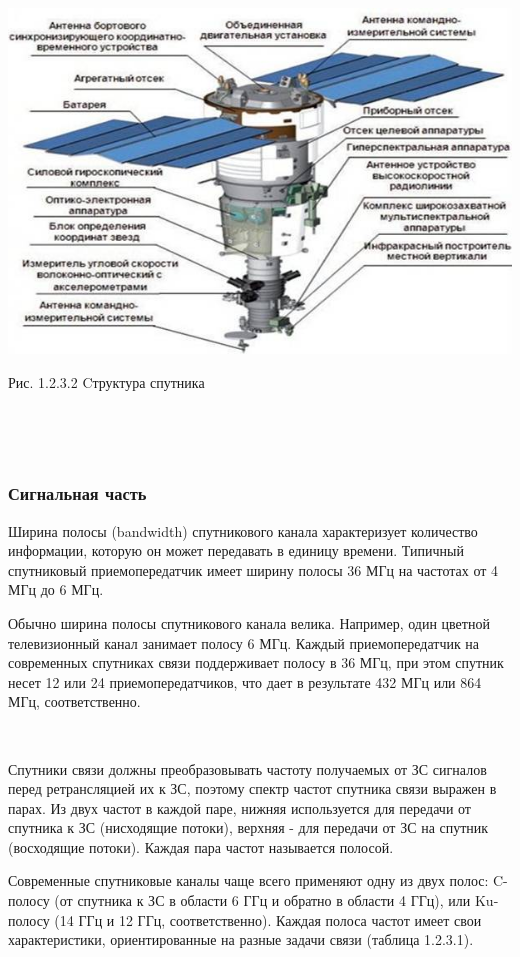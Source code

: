 \documentclass[a4paper]{report}
\begin{document}
\includegraphics[scale=1.1]{71}
{\centering\caption{\newline Рис. 1.2.3.2 Cтруктура спутника}\\}

~

\subsubsection{Сигнальная часть}
Ширина полосы (bandwidth) спутникового канала характеризует количество информации, которую он может передавать в единицу времени. Типичный спутниковый приемопередатчик имеет ширину полосы 36 МГц на частотах от 4 МГц до 6 МГц.

Обычно ширина полосы спутникового канала велика. Например, один цветной телевизионный канал занимает полосу 6 МГц. Каждый приемопередатчик на современных спутниках связи поддерживает полосу в 36 МГц, при этом спутник несет 12 или 24 приемопередатчиков, что дает в результате 432 МГц или 864 МГц, соответственно.

~

Спутники связи должны преобразовывать частоту получаемых от ЗС сигналов перед ретрансляцией их к ЗС, поэтому спектр частот спутника связи выражен в парах. Из двух частот в каждой паре, нижняя используется для передачи от спутника к ЗС (нисходящие потоки), верхняя - для передачи от ЗС на спутник (восходящие потоки). Каждая пара частот называется полосой.

Современные спутниковые каналы чаще всего применяют одну из двух полос: C-полосу (от спутника к ЗС в области 6 ГГц и обратно в области 4 ГГц), или Ku-полосу (14 ГГц и 12 ГГц, соответственно). Каждая полоса частот имеет свои характеристики, ориентированные на разные задачи связи (таблица 1.2.3.1).
\end{document}
